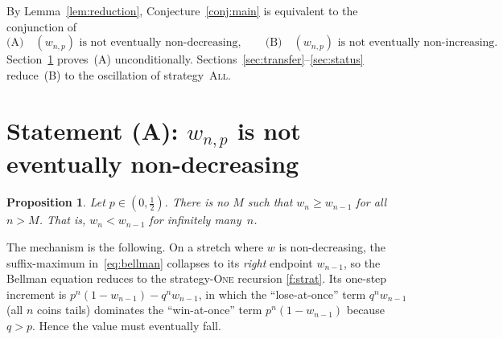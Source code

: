 \documentclass[11pt]{article}
\newtheorem{proposition}[theorem]{Proposition}
\theoremstyle{definition}
\newcommand{\One}{\textsc{One}}
\newcommand{\All}{\textsc{All}}
\begin{document}
By Lemma~\ref{lem:reduction}, Conjecture~\ref{conj:main} is equivalent
to the conjunction of
\begin{equation}\label{eq:two}
  \text{(A)}\quad (w_{n,p})\text{ is not eventually non-decreasing},
  \qquad
  \text{(B)}\quad (w_{n,p})\text{ is not eventually non-increasing}.
\end{equation}
Section~\ref{sec:A} proves~(A) unconditionally.
Sections~\ref{sec:transfer}--\ref{sec:status} reduce~(B) to the
oscillation of strategy~\All.

\section{Statement (A): \texorpdfstring{$w_{n,p}$}{w(n,p)} is not
  eventually non-decreasing}\label{sec:A}

\begin{proposition}\label{prop:A}
  Let $p\in(0,\tfrac12)$. There is no $M$ such that $w_{n}\ge w_{n-1}$
  for all $n>M$. That is, $w_n<w_{n-1}$ for infinitely many~$n$.
\end{proposition}

The mechanism is the following. On a stretch where $w$ is
non-decreasing, the suffix-maximum in~\eqref{eq:bellman} collapses to
its \emph{right} endpoint $w_{n-1}$, so the Bellman equation reduces to
the strategy-\One{} recursion \ref{f:strat}. Its one-step increment is
$p^n(1-w_{n-1})-q^n w_{n-1}$, in which the ``lose-at-once'' term
$q^n w_{n-1}$ (all $n$ coins tails) dominates the ``win-at-once'' term
$p^n(1-w_{n-1})$ because $q>p$. Hence the value must eventually fall.
\end{document}
